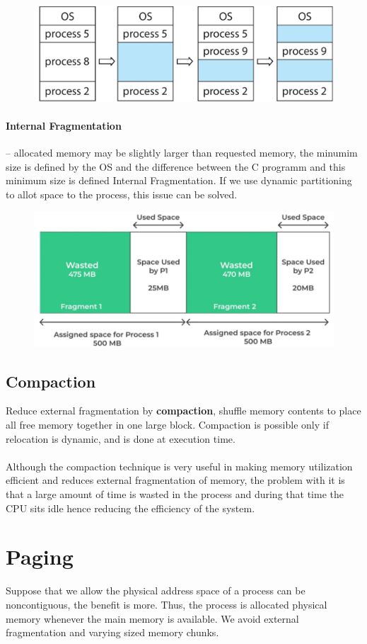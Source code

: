\begin{figure}[htbp]
    \centering
    \includegraphics[width=0.5\linewidth]{img/mkjhg.png}
\end{figure}

\paragraph{Internal Fragmentation} – allocated memory may be slightly larger
than requested memory, the minumim  size is defined by the OS and the difference between the C programm and this minimum size is defined Internal Fragmentation.  If we use dynamic partitioning to allot space to the process, this issue can be solved.

\begin{figure}[htbp]
    \centering
    \includegraphics[width=0.65\linewidth]{img/mht.png}
\end{figure}

\subsection{Compaction}
Reduce external fragmentation by \textbf{compaction}, shuffle memory contents to place all free memory together in one large block. Compaction is possible only if relocation is dynamic, and is done at execution time.

\paragraph{}
Although the compaction technique is very useful in making memory utilization efficient and reduces external fragmentation of memory, the problem with it is that a large amount of time is wasted in the process and during that time the CPU sits idle hence reducing the efficiency of the system.
\newpage
\section{Paging}
Suppose that we allow the physical address space of a process can be noncontiguous, the benefit is more. Thus, the process is allocated physical memory whenever the main memory is available. We avoid external fragmentation and varying sized memory chunks.

